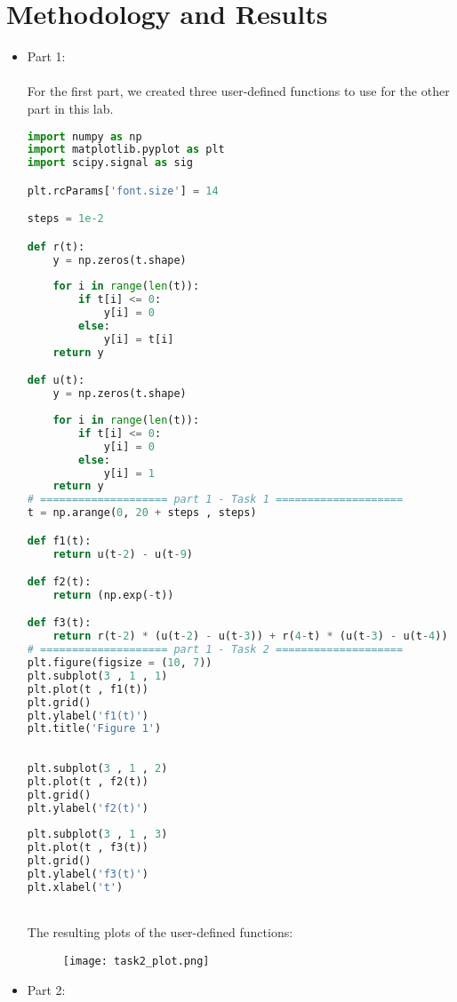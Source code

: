 \documentclass[12pt,a4paper]{article}
\begin{document}
\section{Methodology and Results}\label{sec:meth}
\begin{itemize}
    \item
    Part 1:\\
    
    \\For the first part, we created three user-defined functions to use for the other part in this lab.
    
\begin{lstlisting}[language=Python, caption={User-defined functions}, label={lst:code}, mathescape=true, breaklines=true]
import numpy as np
import matplotlib.pyplot as plt
import scipy.signal as sig

plt.rcParams['font.size'] = 14 

steps = 1e-2

def r(t):
    y = np.zeros(t.shape)
    
    for i in range(len(t)):
        if t[i] <= 0:
            y[i] = 0
        else:
            y[i] = t[i]
    return y

def u(t):
    y = np.zeros(t.shape)
    
    for i in range(len(t)):
        if t[i] <= 0:
            y[i] = 0
        else:
            y[i] = 1
    return y
# ==================== part 1 - Task 1 ====================
t = np.arange(0, 20 + steps , steps)

def f1(t):
    return u(t-2) - u(t-9)

def f2(t):
    return (np.exp(-t))

def f3(t):
    return r(t-2) * (u(t-2) - u(t-3)) + r(4-t) * (u(t-3) - u(t-4))
# ==================== part 1 - Task 2 ====================
plt.figure(figsize = (10, 7))
plt.subplot(3 , 1 , 1)
plt.plot(t , f1(t))
plt.grid()
plt.ylabel('f1(t)')
plt.title('Figure 1')
 
 
plt.subplot(3 , 1 , 2)
plt.plot(t , f2(t))
plt.grid()
plt.ylabel('f2(t)')
 
plt.subplot(3 , 1 , 3)
plt.plot(t , f3(t))
plt.grid()
plt.ylabel('f3(t)')
plt.xlabel('t')
\end{lstlisting}

    \\The resulting plots of the user-defined functions:
\begin{figure}[h]
    \centering
    \texttt{[image: task2\_plot.png]}
\end{figure}
\clearpage
    \item
    Part 2:\\
    

\end{itemize}
\end{document}
